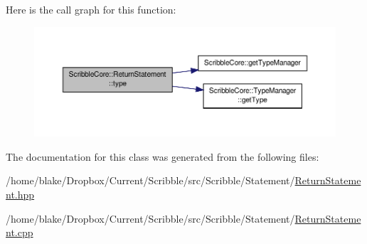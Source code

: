 Here is the call graph for this function\-:
\nopagebreak
\begin{figure}[H]
\begin{center}
\leavevmode
\includegraphics[width=350pt]{class_scribble_core_1_1_return_statement_a4d5daf10f1b3460311960d5c3f609da9_cgraph}
\end{center}
\end{figure}




The documentation for this class was generated from the following files\-:\begin{DoxyCompactItemize}
\item 
/home/blake/\-Dropbox/\-Current/\-Scribble/src/\-Scribble/\-Statement/\hyperlink{_return_statement_8hpp}{Return\-Statement.\-hpp}\item 
/home/blake/\-Dropbox/\-Current/\-Scribble/src/\-Scribble/\-Statement/\hyperlink{_return_statement_8cpp}{Return\-Statement.\-cpp}\end{DoxyCompactItemize}
